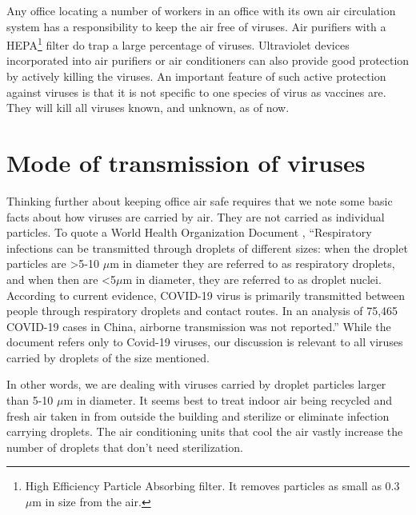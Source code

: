 \begin{multicols}{2}
\vspace{-.2cm}

Any office locating a number of workers in an office with its own air circulation system has a responsibility to keep the air free of viruses. Air purifiers with a HEPA\footnote{High Efficiency Particle Absorbing filter. It removes particles as small as 0.3 $\mu$m in size from the air.} filter do trap a large percentage of viruses. Ultraviolet devices incorporated into air purifiers or air conditioners can also provide good protection by actively killing the viruses. An important feature of such active protection against viruses is that it is not specific to one species of virus as vaccines are. They will kill all viruses known, and unknown, as of now.

\newpage

\vspace{-.3cm}

\section{Mode of transmission of viruses}\label{section-5}

\vspace{-.2cm}

Thinking further about keeping office air safe requires that we note some basic facts about how viruses are carried by air. They are not carried as individual particles. To quote a World Health Organization Document \cite{art3-key03}, “Respiratory infections can be transmitted through droplets of different sizes: when the droplet particles are >5-10 $\mu$m in diameter they are referred to as respiratory droplets, and when then are <5$\mu$m in diameter, they are referred to as droplet nuclei. According to current evidence, COVID-19 virus is primarily transmitted between people through respiratory droplets and contact routes. In an analysis of 75,465 COVID-19 cases in China, airborne transmission was not reported.” While the document refers only to Covid-19 viruses, our discussion is relevant to all viruses carried by droplets of the size mentioned. 

In other words, we are dealing with viruses carried by droplet particles larger than 5-10 $\mu$m in diameter. It seems best to treat indoor air being recycled and fresh air taken in from outside the building and sterilize or eliminate infection carrying droplets. The air conditioning units that cool the air vastly increase the number of droplets that don’t need sterilization.


\end{multicols}
